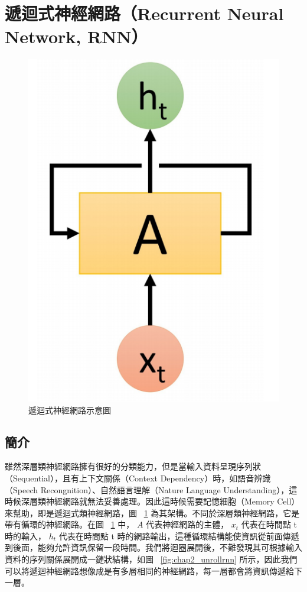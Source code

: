 \section{遞迴式神經網路（Recurrent Neural Network, RNN）}
\begin{figure}[b]
    \centering
    \includegraphics[scale=0.25]{images/chap2_rnn.png}
    \caption{遞迴式神經網路示意圖}\label{fig:chap2_rnn}
\end{figure}
\subsection{簡介}
雖然深層類神經網路擁有很好的分類能力，但是當輸入資料呈現序列狀（Sequential），且有上下文關係（Context Dependency）時，如語音辨識（Speech Recongnition）、自然語言理解（Nature Language Understanding），這時候深層類神經網路就無法妥善處理。因此這時候需要記憶細胞（Memory Cell）來幫助，即是遞迴式類神經網路，圖 ~\ref{fig:chap2_rnn} 為其架構。不同於深層類神經網路，它是帶有循環的神經網路。在圖 ~\ref{fig:chap2_rnn} 中， $A$ 代表神經網路的主體， $x_t$ 代表在時間點 t 時的輸入， $h_t$ 代表在時間點 t 時的網路輸出，這種循環結構能使資訊從前面傳遞到後面，能夠允許資訊保留一段時間。我們將迴圈展開後，不難發現其可根據輸入資料的序列關係展開成一鏈狀結構，如圖 ~\ref{fig:chap2_unrollrnn} 所示，因此我們可以將遞迴神經網路想像成是有多層相同的神經網路，每一層都會將資訊傳遞給下一層。

